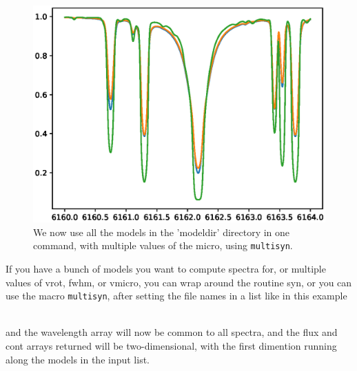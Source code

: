 \documentclass[]{article}
\begin{document}
\begin{figure}[t!]
\centering
\includegraphics[width=14cm]{Figure_5.ps}
\caption{We now use all the models in the 'modeldir' directory in one command, with multiple values of the micro, using {\tt multisyn}.
\label{rotin}
}
\end{figure}


If you have a bunch of models you want to compute spectra for, or multiple values of vrot, fwhm, or vmicro, you can wrap around the routine syn, or you can use the macro {\tt multisyn}, after setting the file names in a list like  in this example


\\

\noindent and the wavelength array will now be common to all spectra, and the flux and cont arrays returned will be two-dimensional, with the first dimention running along the models in the input list.
\end{document}
